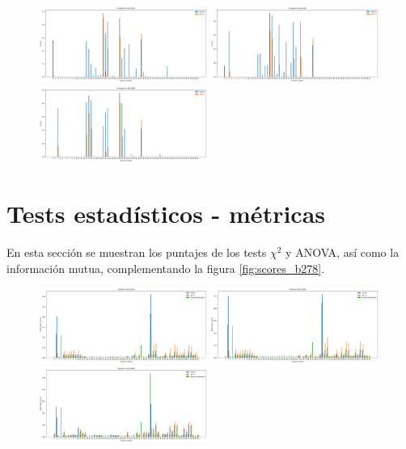 \begin{appendix}
\begin{figure}[h!]
\centering
  \includegraphics[width=0.49\textwidth]{Kap6/test=b234_variable_importance_pvalues.png}  
  \includegraphics[width=0.49\textwidth]{Kap6/test=b261_variable_importance_pvalues.png} \\
  \includegraphics[width=0.49\textwidth]{Kap6/test=b360_variable_importance_pvalues.png} 
\end{figure}

\section{Tests estadísticos - métricas}
\label{anexo_b_scores}
 En esta sección se muestran los puntajes de los tests $\chi^2$ y ANOVA, así como la información mutua, complementando la figura \ref{fig:scores_b278}.
 
\begin{figure}[h!]
\centering
  \includegraphics[width=0.49\textwidth]{Kap6/test=b234_variable_importance_scores.png} 
  \includegraphics[width=0.49\textwidth]{Kap6/test=b261_variable_importance_scores.png} 
  \includegraphics[width=0.49\textwidth]{Kap6/test=b360_variable_importance_scores.png} 
\end{figure}


\end{appendix}
